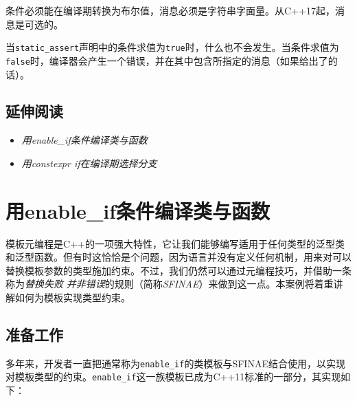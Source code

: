 
条件必须能在编译期转换为布尔值，消息必须是字符串字面量。从C++17起，消息是可选的。


当\texttt{static\_\allowbreak{}assert}声明中的条件求值为\texttt{true}时，什么也不会发生。当条件求值为\texttt{false}时，编译器会产生一个错误，并在其中包含所指定的消息（如果给出了的话）。



\subsection{延伸阅读}



\begin{itemize}
\item \textit{用enable\_if条件编译类与函数}



\item \textit{用constexpr if在编译期选择分支}

\end{itemize}



\section{用enable\_if条件编译类与函数}



模板元编程是C++的一项强大特性，它让我们能够编写适用于任何类型的泛型类和泛型函数。但有时这恰恰是个问题，因为语言并没有定义任何机制，用来对可以替换模板参数的类型施加约束。不过，我们仍然可以通过元编程技巧，并借助一条称为\textit{替换失败} \textit{并非错误}的规则（简称\textit{SFINAE}）来做到这一点。本案例将着重讲解如何为模板实现类型约束。



\subsection{准备工作}



多年来，开发者一直把通常称为\texttt{enable\_\allowbreak{}if}的类模板与SFINAE结合使用，以实现对模板类型的约束。\texttt{enable\_\allowbreak{}if}这一族模板已成为C++11标准的一部分，其实现如下：



